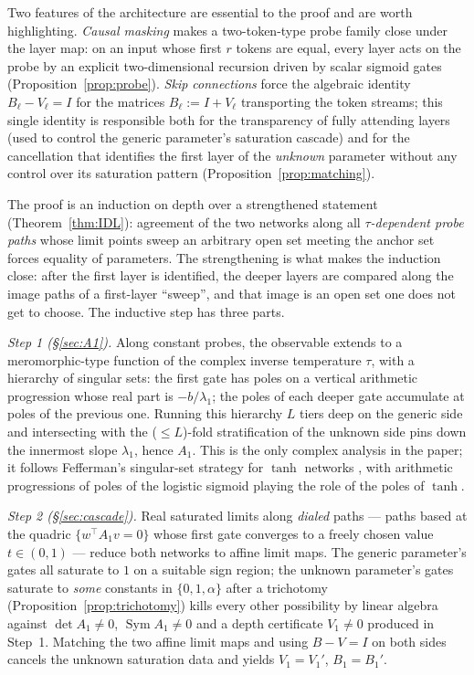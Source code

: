 \documentclass[11pt]{article}
\theoremstyle{definition}
\theoremstyle{remark}
\theoremstyle{plain}
\newcommand{\Sym}{\operatorname{Sym}}
\begin{document}
Two features of the architecture are essential to the proof and are worth highlighting.
\emph{Causal masking} makes a two-token-type probe family close under the layer map: on an
input whose first $r$ tokens are equal, every layer acts on the probe by an explicit
two-dimensional recursion driven by scalar sigmoid gates
(Proposition~\ref{prop:probe}).  \emph{Skip connections} force the algebraic identity
$B_\ell-V_\ell=I$ for the matrices $B_\ell:=I+V_\ell$ transporting the token streams; this
single identity is responsible both for the transparency of fully attending layers (used to
control the generic parameter's saturation cascade) and for the cancellation that
identifies the first layer of the \emph{unknown} parameter without any control over its
saturation pattern (Proposition~\ref{prop:matching}).

The proof is an induction on depth over a strengthened statement
(Theorem~\ref{thm:IDL}): agreement of the two networks along all
\emph{$\tau$-dependent probe paths} whose limit points sweep an arbitrary open set meeting
the anchor set forces equality of parameters.  The strengthening is what makes the
induction close: after the first layer is identified, the deeper layers are compared along
the image paths of a first-layer ``sweep'', and that image is an open set one does not get
to choose.  The inductive step has three parts.

\smallskip
\emph{Step 1 (\S\ref{sec:A1}).}  Along constant probes, the observable extends to a
meromorphic-type function of the complex inverse temperature $\tau$, with a hierarchy of
singular sets: the first gate has poles on a vertical arithmetic progression whose real
part is $-b/\lambda_1$; the poles of each deeper gate accumulate at poles of the previous
one.  Running this hierarchy $L$ tiers deep on the generic side and intersecting with the
($\le L$)-fold stratification of the unknown side pins down the innermost slope
$\lambda_1$, hence $A_1$.  This is the only complex analysis in the paper; it follows
Fefferman's singular-set strategy for $\tanh$ networks \cite{fefferman1994reconstructing},
with arithmetic progressions of poles of the logistic sigmoid playing the role of the poles
of $\tanh$.

\smallskip
\emph{Step 2 (\S\ref{sec:cascade}).}  Real saturated limits along \emph{dialed} paths ---
paths based at the quadric $\{w^\top A_1 v=0\}$ whose first gate converges to a freely
chosen value $t\in(0,1)$ --- reduce both networks to affine limit maps.  The generic
parameter's gates all saturate to $1$ on a suitable sign region; the unknown parameter's
gates saturate to \emph{some} constants in $\{0,1,\alpha\}$ after a trichotomy
(Proposition~\ref{prop:trichotomy}) kills every other possibility by linear algebra against
$\det A_1\neq0$, $\Sym A_1\neq 0$ and a depth certificate $V_1\neq 0$ produced in Step~1.
Matching the two affine limit maps and using $B-V=I$ on both sides cancels the unknown
saturation data and yields $V_1=V_1'$, $B_1=B_1'$.
\end{document}
